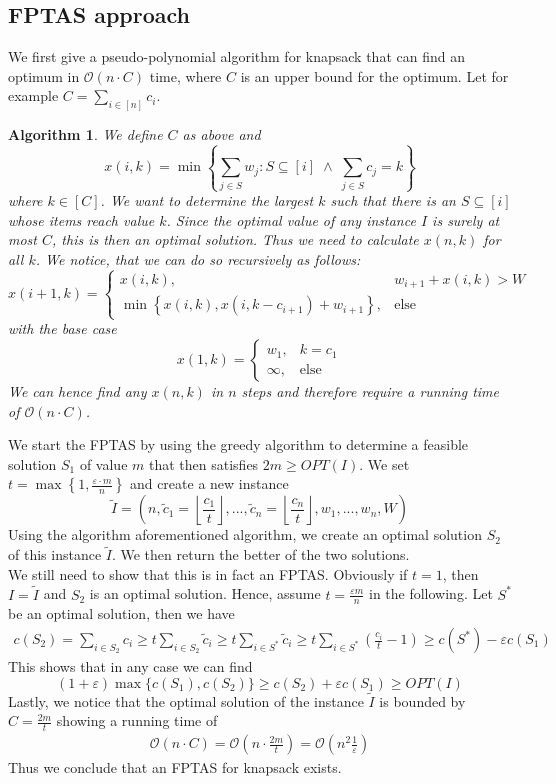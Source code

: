\documentclass[a4paper, 12pt]{article}
\newtheorem{alg}{Algorithm}[section]
\begin{document}
	\subsection{FPTAS approach}
	We first give a pseudo-polynomial algorithm for knapsack that can find an optimum in $\mathcal{O}(n \cdot C)$ time, where $C$ is an upper bound for the optimum. Let for example $C = \sum_{i \in [n]} c_i$. \begin{alg}
		We define $C$ as above and \[x(i,k) = \min \left\{\sum_{j \in S} w_j : S\subseteq [i] \; \land \; \sum_{j \in S} c_j = k\right\}\]
		where $k \in [C]$. We want to determine the largest $k$ such that there is an $S \subseteq [i]$ whose items reach value $k$. Since the optimal value of any instance $I$ is surely at most $C$, this is then an optimal solution. Thus we need to calculate $x(n,k)$ for all $k$. We notice, that we can do so recursively as follows: \[x(i+1,k) = \begin{cases}
			x(i,k), & w_{i+1} + x(i,k) > W\\
			\min\left\{x(i,k), x(i,k-c_{i+1}) + w_{i+1}\right\}, & \text{else} 
		\end{cases}\]
	with the base case \[x(1,k) = \begin{cases}
		w_1, & k = c_1\\
		\infty, & \text{else}
	\end{cases}\]
	We can hence find any $x(n,k)$ in $n$ steps and therefore require a running time of $\mathcal{O}(n\cdot C)$.
	\end{alg}
	We start the FPTAS by using the greedy algorithm to determine a feasible solution $S_1$ of value $m$ that then satisfies $2m \geq OPT(I)$. We set $t = \max\left\{1, \frac{\varepsilon\cdot m}{n}\right\}$ and create a new instance \[\tilde{I} = (n, \tilde{c}_1 = \left\lfloor\frac{c_1}{t}\right\rfloor, ..., \tilde{c}_n = \left\lfloor \frac{c_n}{t}\right\rfloor, w_1,...,w_n,W)\]
	Using the algorithm aforementioned algorithm, we create an optimal solution $S_2$ of this instance $\tilde{I}$. We then return the better of the two solutions.\\
	We still need to show that this is in fact an FPTAS. Obviously if $t = 1$, then $I = \tilde{I}$ and $S_2$ is an optimal solution. Hence, assume $t = \frac{\varepsilon m}{n}$ in the following. Let $S^*$ be an optimal solution, then we have \begin{align}
		c(S_2) = \sum_{i \in S_2} c_i \geq t\sum_{i \in S_2}\tilde{c}_i \geq t \sum_{i \in S^*} \tilde{c}_i \geq t \sum_{i \in S^*}\left(\frac{c_i}{t}-1\right) \geq c(S^*)-\varepsilon c(S_1)
	\end{align}
	This shows that in any case we can find \[(1+\varepsilon)\max\{c(S_1),c(S_2)\} \geq c(S_2) + \varepsilon c(S_1) \geq OPT(I)\]
	Lastly, we notice that the optimal solution of the instance $\tilde{I}$ is bounded by $C = \frac{2m}{t}$ showing a running time of \begin{align}
		\mathcal{O}(n\cdot C) = \mathcal{O}\left(n \cdot \frac{2m}{t}\right) = \mathcal{O}\left(n^2\frac{1}{\varepsilon}\right)
	\end{align}
	Thus we conclude that an FPTAS for knapsack exists.
\end{document}

